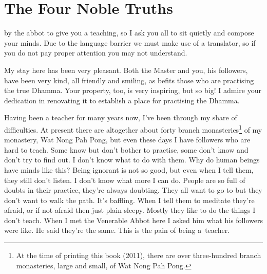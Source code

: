 
\chapter{The Four Noble Truths}

 by the abbot to give you a teaching, so I ask you all to sit quietly and compose your minds. Due to the language barrier we must make use of a translator, so if you do not pay proper attention you may not understand. 

My stay here has been very pleasant. Both the Master and you, his followers, have been very kind, all friendly and smiling, as befits those who are practising the true Dhamma. Your property, too, is very inspiring, but so big! I admire your dedication in renovating it to establish a place for practising the Dhamma. 

Having been a teacher for many years now, I've been through my share of difficulties. At present there are altogether about forty branch monasteries\footnote{At the time of printing this book (2011), there are over three-hundred branch monasteries, large and small, of Wat Nong Pah Pong.} of my monastery, Wat Nong Pah Pong, but even these days I have followers who are hard to teach. Some know but don't bother to practise, some don't know and don't try to find out. I don't know what to do with them. Why do human beings have minds like this? Being ignorant is not so good, but even when I tell them, they still don't listen. I don't know what more I can do. People are so full of doubts in their practice, they're always doubting. They all want to go to  but they don't want to walk the path. It's baffling. When I tell them to meditate they're afraid, or if not afraid then just plain sleepy. Mostly they like to do the things I don't teach. When I met the Venerable Abbot here I asked him what his followers were like. He said they're the same. This is the pain of being a~teacher. 


